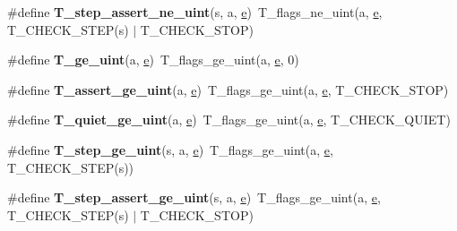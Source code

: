 \begin{DoxyCompactItemize}
\#define {\bfseries T\+\_\+step\+\_\+assert\+\_\+ne\+\_\+uint}(s,  a,  \mbox{\hyperlink{sun4u_2tte_8h_a8b0b9ed08e0e18920ec2682f48228c27}{e}})~T\+\_\+flags\+\_\+ne\+\_\+uint(a, \mbox{\hyperlink{sun4u_2tte_8h_a8b0b9ed08e0e18920ec2682f48228c27}{e}}, T\+\_\+\+C\+H\+E\+C\+K\+\_\+\+S\+T\+EP(s) $\vert$ T\+\_\+\+C\+H\+E\+C\+K\+\_\+\+S\+T\+OP)
\item 
\mbox{\label{group__RTEMSTestFrameworkChecksUInt_ga8968c3af57ec2038633fe8eac4061f0c}} 
\#define {\bfseries T\+\_\+ge\+\_\+uint}(a,  \mbox{\hyperlink{sun4u_2tte_8h_a8b0b9ed08e0e18920ec2682f48228c27}{e}})~T\+\_\+flags\+\_\+ge\+\_\+uint(a, \mbox{\hyperlink{sun4u_2tte_8h_a8b0b9ed08e0e18920ec2682f48228c27}{e}}, 0)
\item 
\mbox{\label{group__RTEMSTestFrameworkChecksUInt_gaa420e1145643cff7fba1bde4b5b3aa07}} 
\#define {\bfseries T\+\_\+assert\+\_\+ge\+\_\+uint}(a,  \mbox{\hyperlink{sun4u_2tte_8h_a8b0b9ed08e0e18920ec2682f48228c27}{e}})~T\+\_\+flags\+\_\+ge\+\_\+uint(a, \mbox{\hyperlink{sun4u_2tte_8h_a8b0b9ed08e0e18920ec2682f48228c27}{e}}, T\+\_\+\+C\+H\+E\+C\+K\+\_\+\+S\+T\+OP)
\item 
\mbox{\label{group__RTEMSTestFrameworkChecksUInt_ga6f6eaeaa26dab7ac2a8b5303e12d27ba}} 
\#define {\bfseries T\+\_\+quiet\+\_\+ge\+\_\+uint}(a,  \mbox{\hyperlink{sun4u_2tte_8h_a8b0b9ed08e0e18920ec2682f48228c27}{e}})~T\+\_\+flags\+\_\+ge\+\_\+uint(a, \mbox{\hyperlink{sun4u_2tte_8h_a8b0b9ed08e0e18920ec2682f48228c27}{e}}, T\+\_\+\+C\+H\+E\+C\+K\+\_\+\+Q\+U\+I\+ET)
\item 
\mbox{\label{group__RTEMSTestFrameworkChecksUInt_ga31665dbd626b4ee73dbcbea068436d5b}} 
\#define {\bfseries T\+\_\+step\+\_\+ge\+\_\+uint}(s,  a,  \mbox{\hyperlink{sun4u_2tte_8h_a8b0b9ed08e0e18920ec2682f48228c27}{e}})~T\+\_\+flags\+\_\+ge\+\_\+uint(a, \mbox{\hyperlink{sun4u_2tte_8h_a8b0b9ed08e0e18920ec2682f48228c27}{e}}, T\+\_\+\+C\+H\+E\+C\+K\+\_\+\+S\+T\+EP(s))
\item 
\mbox{\label{group__RTEMSTestFrameworkChecksUInt_gac55ab8a93f1c9613b25102290a6aa418}} 
\#define {\bfseries T\+\_\+step\+\_\+assert\+\_\+ge\+\_\+uint}(s,  a,  \mbox{\hyperlink{sun4u_2tte_8h_a8b0b9ed08e0e18920ec2682f48228c27}{e}})~T\+\_\+flags\+\_\+ge\+\_\+uint(a, \mbox{\hyperlink{sun4u_2tte_8h_a8b0b9ed08e0e18920ec2682f48228c27}{e}}, T\+\_\+\+C\+H\+E\+C\+K\+\_\+\+S\+T\+EP(s) $\vert$ T\+\_\+\+C\+H\+E\+C\+K\+\_\+\+S\+T\+OP)

\end{DoxyCompactItemize}
